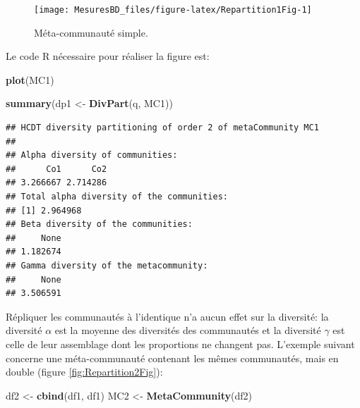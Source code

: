 \documentclass[
  11pt,
  french,
  a4paper,
  extrafontsizes,onecolumn,openright
  ]{memoir}
\newenvironment{Shaded}{\begin{snugshade}}{\end{snugshade}}
\newcommand{\KeywordTok}[1]{\textcolor[rgb]{0.13,0.29,0.53}{\textbf{#1}}}
\newcommand{\NormalTok}[1]{#1}
\newcommand{\StringTok}[1]{\textcolor[rgb]{0.31,0.60,0.02}{#1}}
\begin{document}
\normalsize

\scriptsize

\begin{figure}

{\centering \texttt{[image: MesuresBD\_files/figure-latex/Repartition1Fig-1]} 

}

\caption{Méta-communauté simple.}\label{fig:Repartition1Fig}
\end{figure}

\normalsize

Le code R nécessaire pour réaliser la figure est:

\scriptsize

\begin{Shaded}
\begin{Highlighting}[]
\KeywordTok{plot}\NormalTok{(MC1)}
\end{Highlighting}
\end{Shaded}

\normalsize

\scriptsize

\begin{Shaded}
\begin{Highlighting}[]
\KeywordTok{summary}\NormalTok{(dp1 <-}\StringTok{ }\KeywordTok{DivPart}\NormalTok{(q, MC1))}
\end{Highlighting}
\end{Shaded}

\begin{verbatim}
## HCDT diversity partitioning of order 2 of metaCommunity MC1
## 
## Alpha diversity of communities: 
##      Co1      Co2 
## 3.266667 2.714286 
## Total alpha diversity of the communities: 
## [1] 2.964968
## Beta diversity of the communities: 
##     None 
## 1.182674 
## Gamma diversity of the metacommunity: 
##     None 
## 3.506591
\end{verbatim}

\normalsize

Répliquer les communautés à l'identique n'a aucun effet sur la diversité: la diversité \(\alpha\) est la moyenne des diversités des communautés et la diversité \(\gamma\) est celle de leur assemblage dont les proportions ne changent pas.
L'exemple suivant concerne une méta-communauté contenant les mêmes communautés, mais en double (figure \ref{fig:Repartition2Fig}):

\scriptsize

\begin{Shaded}
\begin{Highlighting}[]
\NormalTok{df2 <-}\StringTok{ }\KeywordTok{cbind}\NormalTok{(df1, df1)}
\NormalTok{MC2 <-}\StringTok{ }\KeywordTok{MetaCommunity}\NormalTok{(df2)}
\end{Highlighting}
\end{Shaded}
\end{document}
